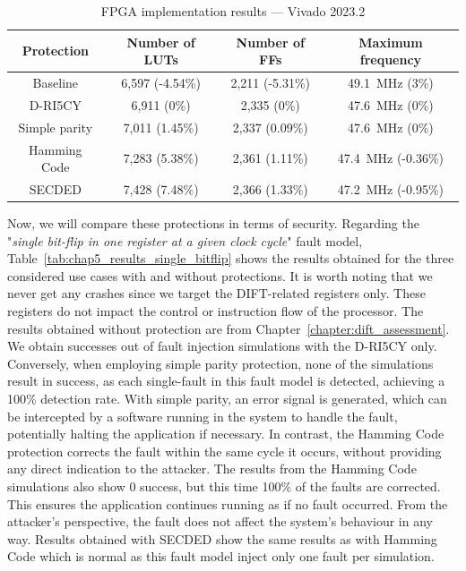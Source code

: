 \begin{table}[t]
    \footnotesize
    \centering
    \caption{FPGA implementation results — Vivado 2023.2}
    \label{tab:chap5_implementation}
    \setlength{\tabcolsep}{3pt}
    \begin{tabular}{@{}c|ccc@{}}
        \toprule
        Protection    & Number of LUTs   & Number of FFs    & Maximum frequency                \\ \midrule
        Baseline      & 6,597 (-4.54\%) & 2,211 (-5.31\%) & \SI{49.1}{\mega\hertz} (3\%)     \\
        D-RI5CY       & 6,911 (0\%)     & 2,335 (0\%)     & \SI{47.6}{\mega\hertz} (0\%)     \\
        Simple parity & 7,011 (1.45\%)  & 2,337 (0.09\%)  & \SI{47.6}{\mega\hertz} (0\%)     \\
        Hamming Code  & 7,283 (5.38\%)  & 2,361 (1.11\%)  & \SI{47.4}{\mega\hertz} (-0.36\%) \\
        SECDED        & 7,428 (7.48\%)  & 2,366 (1.33\%)  & \SI{47.2}{\mega\hertz} (-0.95\%) \\
        \bottomrule
    \end{tabular}
\end{table}

Now, we will compare these protections in terms of security.
Regarding the "\textit{single bit-flip in one register at a given clock cycle}" fault model, Table~\ref{tab:chap5_results_single_bitflip} shows the results obtained for the three considered use cases with and without protections. It is worth noting that we never get any crashes since we target the DIFT-related registers only. These registers do not impact the control or instruction flow of the processor.
The results obtained without protection are from Chapter~\ref{chapter:dift_assessment}. We obtain  successes out of  fault injection simulations with the D-RI5CY only.
Conversely, when employing simple parity protection, none of the  simulations result in success, as each single-fault in this fault model is detected, achieving a 100\% detection rate. With simple parity, an error signal is generated, which can be intercepted by a software running in the system to handle the fault, potentially halting the application if necessary. In contrast, the Hamming Code protection corrects the fault within the same cycle it occurs, without providing any direct indication to the attacker. The results from the Hamming Code simulations also show 0 success, but this time 100\% of the faults are corrected. This ensures the application continues running as if no fault occurred. From the attacker’s perspective, the fault does not affect the system’s behaviour in any way.
Results obtained with SECDED show the same results as with Hamming Code which is normal as this fault model inject only one fault per simulation.

